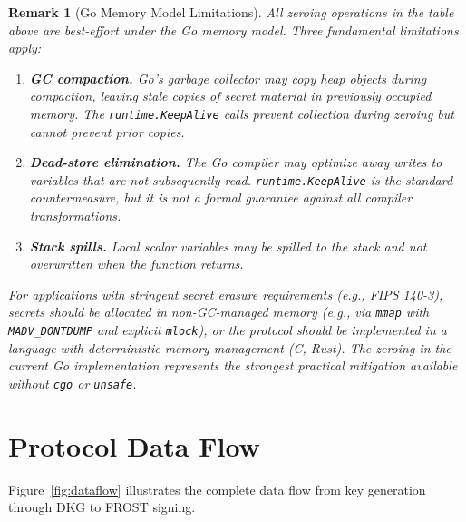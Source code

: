 \documentclass[11pt,a4paper]{article}
\newtheorem{remark}{Remark}[section]
\begin{document}
\begin{remark}[Go Memory Model Limitations]
  \label{rem:go-zeroing}
  All zeroing operations in the table above are \emph{best-effort} under the
  Go memory model. Three fundamental limitations apply:

  \begin{enumerate}[nosep]
    \item \textbf{GC compaction.} Go's garbage collector may copy heap objects
      during compaction, leaving stale copies of secret material in previously
      occupied memory. The \texttt{runtime.KeepAlive} calls prevent collection
      \emph{during} zeroing but cannot prevent prior copies.
    \item \textbf{Dead-store elimination.} The Go compiler may optimize away
      writes to variables that are not subsequently read.
      \texttt{runtime.KeepAlive} is the standard countermeasure, but it is not
      a formal guarantee against all compiler transformations.
    \item \textbf{Stack spills.} Local scalar variables may be spilled to the
      stack and not overwritten when the function returns.
  \end{enumerate}

  \noindent
  For applications with stringent secret erasure requirements (e.g., FIPS
  140-3), secrets should be allocated in non-GC-managed memory (e.g., via
  \texttt{mmap} with \texttt{MADV\_DONTDUMP} and explicit \texttt{mlock}),
  or the protocol should be implemented in a language with deterministic
  memory management (C, Rust). The zeroing in the current Go implementation
  represents the strongest practical mitigation available without
  \texttt{cgo} or \texttt{unsafe}.
\end{remark}

\section{Protocol Data Flow}
\label{sec:dataflow}

Figure~\ref{fig:dataflow} illustrates the complete data flow from key
generation through DKG to FROST signing.
\end{document}

